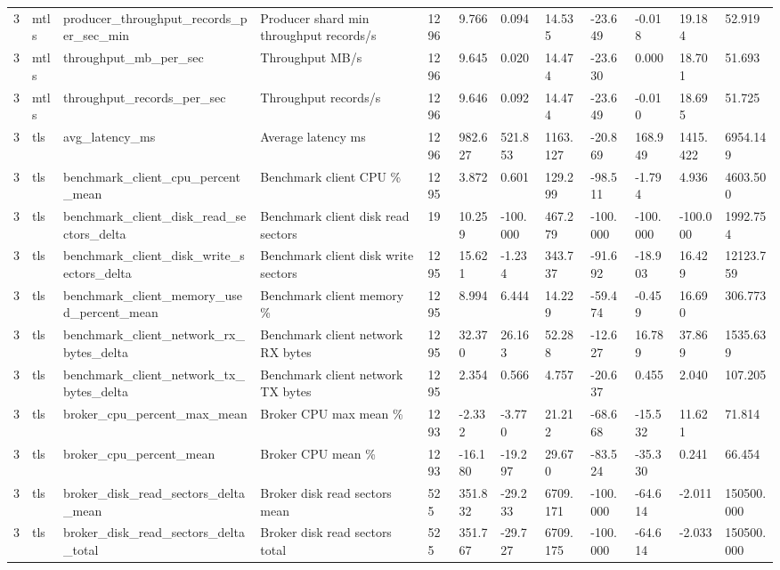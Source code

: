 \begin{longtable}{llllllllllll}
3 & mtls & producer\_throughput\_records\_per\_sec\_min & Producer shard min throughput records/s & 1296 & 9.766 & 0.094 & 14.535 & -23.649 & -0.018 & 19.184 & 52.919 \\
3 & mtls & throughput\_mb\_per\_sec & Throughput MB/s & 1296 & 9.645 & 0.020 & 14.474 & -23.630 & 0.000 & 18.701 & 51.693 \\
3 & mtls & throughput\_records\_per\_sec & Throughput records/s & 1296 & 9.646 & 0.092 & 14.474 & -23.649 & -0.010 & 18.695 & 51.725 \\
3 & tls & avg\_latency\_ms & Average latency ms & 1296 & 982.627 & 521.853 & 1163.127 & -20.869 & 168.949 & 1415.422 & 6954.149 \\
3 & tls & benchmark\_client\_cpu\_percent\_mean & Benchmark client CPU \% & 1295 & 3.872 & 0.601 & 129.299 & -98.511 & -1.794 & 4.936 & 4603.500 \\
3 & tls & benchmark\_client\_disk\_read\_sectors\_delta & Benchmark client disk read sectors & 19 & 10.259 & -100.000 & 467.279 & -100.000 & -100.000 & -100.000 & 1992.754 \\
3 & tls & benchmark\_client\_disk\_write\_sectors\_delta & Benchmark client disk write sectors & 1295 & 15.621 & -1.234 & 343.737 & -91.692 & -18.903 & 16.429 & 12123.759 \\
3 & tls & benchmark\_client\_memory\_used\_percent\_mean & Benchmark client memory \% & 1295 & 8.994 & 6.444 & 14.229 & -59.474 & -0.459 & 16.690 & 306.773 \\
3 & tls & benchmark\_client\_network\_rx\_bytes\_delta & Benchmark client network RX bytes & 1295 & 32.370 & 26.163 & 52.288 & -12.627 & 16.789 & 37.869 & 1535.639 \\
3 & tls & benchmark\_client\_network\_tx\_bytes\_delta & Benchmark client network TX bytes & 1295 & 2.354 & 0.566 & 4.757 & -20.637 & 0.455 & 2.040 & 107.205 \\
3 & tls & broker\_cpu\_percent\_max\_mean & Broker CPU max mean \% & 1293 & -2.332 & -3.770 & 21.212 & -68.668 & -15.532 & 11.621 & 71.814 \\
3 & tls & broker\_cpu\_percent\_mean & Broker CPU mean \% & 1293 & -16.180 & -19.297 & 29.670 & -83.524 & -35.330 & 0.241 & 66.454 \\
3 & tls & broker\_disk\_read\_sectors\_delta\_mean & Broker disk read sectors mean & 525 & 351.832 & -29.233 & 6709.171 & -100.000 & -64.614 & -2.011 & 150500.000 \\
3 & tls & broker\_disk\_read\_sectors\_delta\_total & Broker disk read sectors total & 525 & 351.767 & -29.727 & 6709.175 & -100.000 & -64.614 & -2.033 & 150500.000 \\

\end{longtable}
